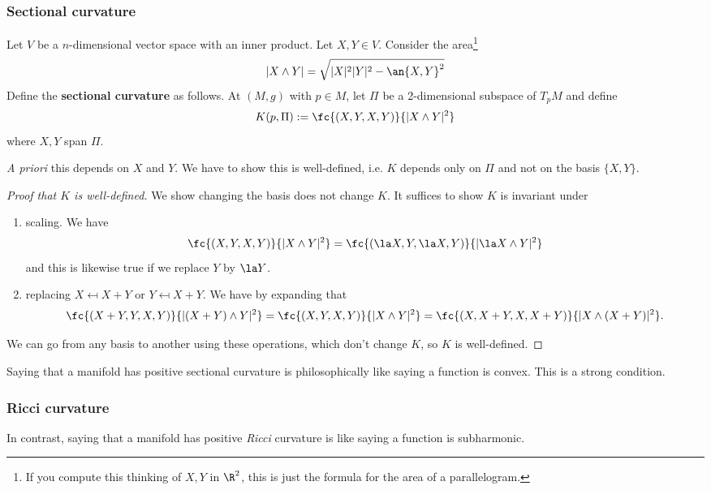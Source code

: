\subsubsection{Sectional curvature}
\begin{df}
Let $V$ be a $n$-dimensional vector space with an inner product. Let $X,Y\in V$. Consider the area\footnote{If you compute this thinking of $X,Y$ in $\R^2$, this is just the formula for the area of a parallelogram.}
\[
|X\wedge Y|=\sqrt{|X|^2|Y|^2-\an{X,Y}^2}
\]
Define the \textbf{sectional curvature} as follows. At $(M,g)$ with $p\in M$, let $\Pi$ be a 2-dimensional subspace of $T_pM$ and define
\[
K(p,\Pi):=\fc{(X,Y,X,Y)}{|X\wedge Y|^2} %
\]
where $X,Y$ span $\Pi$.
\end{df}
{\it A priori} this depends on $X$ and $Y$. We have to show this is well-defined, i.e. $K$ depends only on $\Pi$ and not on the basis $\{X,Y\}$.
\begin{proof}[Proof that $K$ is well-defined]
We show changing the basis does not change $K$. It suffices to show $K$ is invariant under
\begin{enumerate}
\item
scaling. We have
\[
\fc{(X,Y,X,Y)}{|X\wedge Y|^2}=\fc{(\la X,Y,\la X,Y)}{|\la X\wedge Y|^2}
\]
and this is likewise true if we replace $Y$ by $\la Y$.
\item
replacing $X\mapsfrom X+Y$ or $Y\mapsfrom X+Y$. We have by expanding that
\[
\fc{(X+Y,Y,X,Y)}{|(X+Y)\wedge Y|^2}=\fc{(X,Y,X,Y)}{|X\wedge Y|^2}=\fc{(X,X+Y,X,X+Y)}{|X\wedge (X+Y)|^2}.
\]
\end{enumerate}
We can go from any basis to another using these operations, which don't change $K$, so $K$ is well-defined.
\end{proof}
Saying that a manifold has positive sectional curvature is philosophically like saying a function is convex. This is a strong condition.
\subsubsection{Ricci curvature}
In contrast, saying that a manifold has positive {\it Ricci} curvature is like saying a function is subharmonic.%


